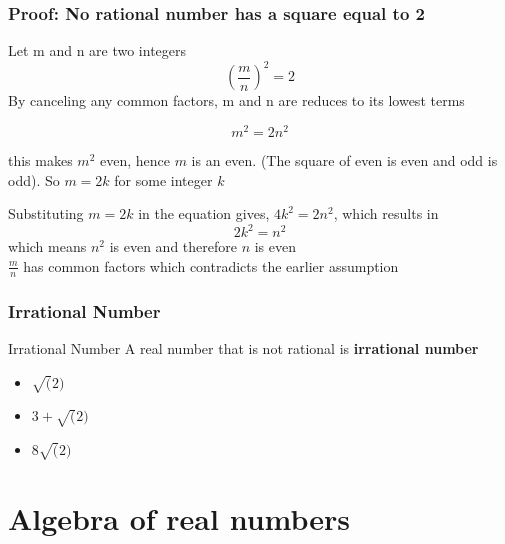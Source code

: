 \documentclass{beamer}
\begin{document}
\begin{frame}
    \frametitle{Proof: No rational number has a square equal to 2}
    Let m and n are two integers
    \[ 
        \left( \frac{m}{n} \right)^{2} = 2  
    \]
    By canceling any common factors, m and n are reduces to its lowest terms 

    \[
         m^{2} = 2n^{2}
    \]

    this makes \(m^{2}\) even, hence \(m\) is an even. (The square of even is even and odd is odd). So \(m = 2k\) for some integer \(k\)

    Substituting \(m = 2k\) in the equation gives, \(4k^{2} = 2n^{2} \), which results in 
    \[
        2k^{2} = n^{2}
    \]
    which means \( n^{2}\) is even and therefore \(n \) is even
    \\
    \(\frac{m}{n} \) has common factors which contradicts the earlier assumption
\end{frame}

\begin{frame}
    \frametitle{Irrational Number}

    \begin{block}{Irrational Number}
        A real number that is not rational is \textbf{irrational number}
    \end{block}
    \begin{itemize}
        \item \( \sqrt(2)\)
        \item \(3+\sqrt(2)\)
        \item \(8\sqrt(2)\)
    \end{itemize}
\end{frame}

\section{Algebra of real numbers}
\end{document}
